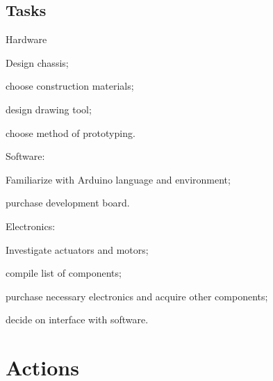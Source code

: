 \documentclass[a4paper,11pt,twoside,class=meetingmins,crop=false]{standalone}
\begin{document}
\begin{items}
\subsection{Tasks}
    \item Hardware
    \begin{subitems}
        \item Design chassis;
        \item choose construction materials;
        \item design drawing tool;
        \item choose method of prototyping.
    \end{subitems}
    \item Software:
    \begin{subitems}
        \item Familiarize with Arduino language and environment;
        \item purchase development board.
    \end{subitems}
    \item Electronics:
    \begin{subitems}
        \item Investigate actuators and motors;
        \item compile list of components;
        \item purchase necessary electronics and acquire other components;
        \item decide on interface with software.
    \end{subitems}
\end{items}

\vspace{1em}
\vspace{1em}

\section{Actions}
\begin{items}
\end{items}
\end{document}
